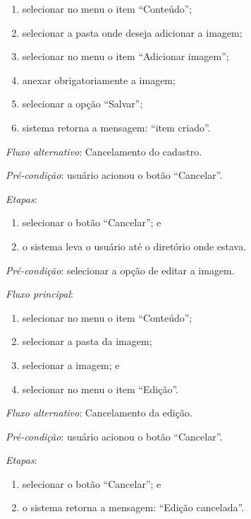 \documentclass[a4paper,12pt]{article}
\begin{document}
\begin{enumerate}
    \item selecionar no menu o item ``Conteúdo'';
    \item selecionar a pasta onde deseja adicionar a imagem;
    \item selecionar no menu o item ``Adicionar imagem'';
    \item anexar obrigatoriamente a imagem;
    \item selecionar a opção ``Salvar'';
    \item sistema retorna a mensagem: ``item criado''.
\end{enumerate}

\noindent \textit{Fluxo alternativo}: Cancelamento do cadastro.

\noindent \textit{Pré-condição}:  usuário acionou o botão ``Cancelar''.

\noindent \textit{Etapas}:

\begin{enumerate}
    \item selecionar o botão ``Cancelar''; e
    \item o sistema leva o usuário até o diretório onde estava.
\end{enumerate}



\vspace{0.7cm}

\noindent \textit{Pré-condição}: selecionar a opção de editar a imagem.

\noindent \textit{Fluxo principal}:

\begin{enumerate}
    \item selecionar no menu o item ``Conteúdo'';
    \item selecionar a pasta da imagem;
    \item selecionar a imagem; e
    \item selecionar no menu o item ``Edição''.
\end{enumerate}

\noindent \textit{Fluxo alternativo}: Cancelamento da edição.

\noindent \textit{Pré-condição}: usuário acionou o botão ``Cancelar''.

\noindent \textit{Etapas}:

\begin{enumerate}
    \item selecionar o botão ``Cancelar''; e
    \item o sistema retorna a mensagem: ``Edição cancelada''.
\end{enumerate}
\end{document}
